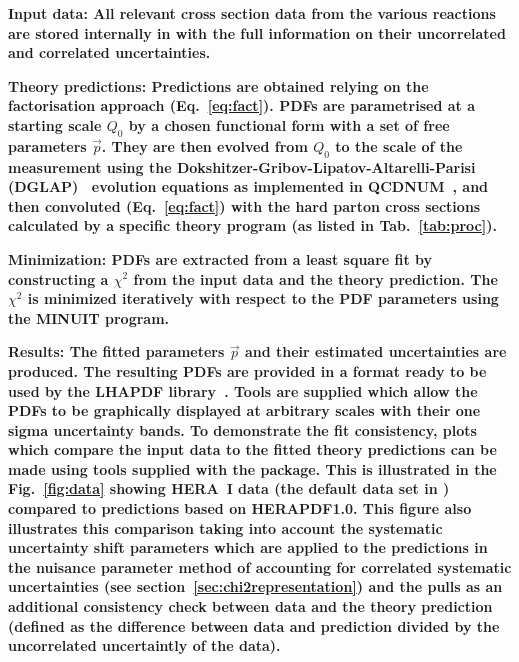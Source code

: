 \begin{description}
\item 
\bf {Input data:} \rm  All relevant cross section data from the various reactions
are stored internally in \fitter with the full information on their uncorrelated and correlated
uncertainties.
\item
\bf{Theory predictions:} \rm Predictions are obtained relying on the factorisation approach (Eq.~\ref{eq:fact}). PDFs are parametrised at a starting scale $Q_0$  by a chosen functional form with a set of free parameters $\vec{p}$. They are then evolved from $Q_0$ to the scale of the measurement using the 
Dokshitzer-Gribov-Lipatov-Altarelli-Parisi 
(DGLAP)~\cite{Gribov:1972ri, Gribov:1972rt, Lipatov:1974qm,
Dokshitzer:1977sg, Altarelli:1977zs} evolution equations 
as implemented in QCDNUM~\cite{qcdnum}, 
and then convoluted (Eq.~\ref{eq:fact}) with the hard parton cross sections calculated by
a specific theory program (as listed in Tab.~\ref{tab:proc}).
\item
\bf{Minimization:} \rm  PDFs are extracted from a least square fit by constructing a 
$\chi^2$ from the input data and the theory prediction.
The $\chi^2$ is  minimized iteratively 
with respect to the PDF parameters using the MINUIT\cite{minuit} program.
%
%
\item
\bf{Results:} \rm  The fitted parameters $\vec{p}$ and their estimated uncertainties are produced.
The resulting PDFs are provided in a format ready to be used by the LHAPDF 
library~\cite{lhapdf,lhapdfweb}. Tools are supplied which allow the PDFs to be
graphically 
displayed at arbitrary scales with their one sigma uncertainty bands.
To demonstrate the fit consistency, plots 
which compare the input data to the fitted theory predictions can be made using
tools supplied with the package. 
This is illustrated in the Fig.~\ref{fig:data} showing  
HERA~I data (the default data set in \fitter) compared to predictions based on 
HERAPDF1.0\cite{h1zeus:2009wt}. This figure also illustrates this comparison 
taking into account the systematic uncertainty shift parameters which are 
applied to the predictions in the nuisance parameter method of accounting for 
correlated systematic uncertainties (see section~\ref{sec:chi2representation}) and the pulls 
as an additional consistency check between data and the theory prediction 
(defined as the difference between data and prediction divided by the uncorrelated uncertaintly of the data).

\end{description}
